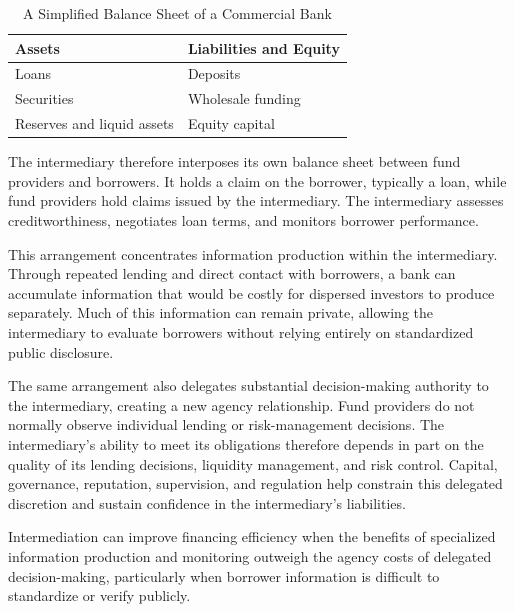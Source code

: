 \begin{table}[htbp]

\centering

\caption{A Simplified Balance Sheet of a Commercial Bank}

\label{tab:ch4-bank-balance-sheet}

\begin{tabularx}{0.78\textwidth}{@{}X X@{}}

\toprule

\textbf{Assets} & \textbf{Liabilities and Equity} \\

\midrule

Loans                      & Deposits \\
Securities                 & Wholesale funding \\
Reserves and liquid assets & Equity capital \\

\bottomrule

\end{tabularx}

\end{table}

The intermediary therefore interposes its own balance sheet between fund providers and borrowers. It holds a claim on the borrower, typically a loan, while fund providers hold claims issued by the intermediary. The intermediary assesses creditworthiness, negotiates loan terms, and monitors borrower performance.

This arrangement concentrates information production within the intermediary. Through repeated lending and direct contact with borrowers, a bank can accumulate information that would be costly for dispersed investors to produce separately. Much of this information can remain private, allowing the intermediary to evaluate borrowers without relying entirely on standardized public disclosure.

The same arrangement also delegates substantial decision-making authority to the intermediary, creating a new agency relationship. Fund providers do not normally observe individual lending or risk-management decisions. The intermediary's ability to meet its obligations therefore depends in part on the quality of its lending decisions, liquidity management, and risk control. Capital, governance, reputation, supervision, and regulation help constrain this delegated discretion and sustain confidence in the intermediary's liabilities.

Intermediation can improve financing efficiency when the benefits of specialized information production and monitoring outweigh the agency costs of delegated decision-making, particularly when borrower information is difficult to standardize or verify publicly.

